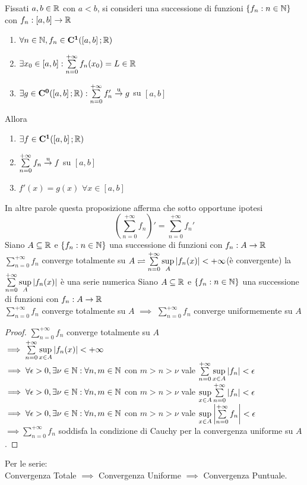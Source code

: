 \begin{corollary}
	\label{coro:deriv_series_series_of_deriv}
	Fissati $a,b\in \mathbb{R}$ con $a<b$, si consideri una successione di funzioni $\left\{f_n:n\in\mathbb{N}\right\}$ con $f_n:\left[a,b\right]\to \mathbb{R}$
	\begin{enumerate}
		\item $\forall n\in\mathbb{N}, f_n\in \mathbf{C^{1}}(\left[a,b\right]; \mathbb{R})$
		\item $\exists x_0\in\left[a,b\right]: \sum\limits_{n=0}^{+\infty}f_n(x_0)=L\in \mathbb{R}$
		\item $\exists g \in \mathbf{C^{0}}(\left[a,b\right]; \mathbb{R}): \sum\limits_{n=0}^{+\infty}f'_n \overset{\text{u}}{\to} g$ su $\left[a,b\right]$
	\end{enumerate}
	Allora
	\begin{enumerate}
		\item $\exists f\in \mathbf{C^{1}}(\left[a,b\right]; \mathbb{R})$
		\item $\sum\limits_{n=0}^{+\infty}f_n \overset{\text{u}}{\to} f$ su $\left[a,b\right]$
		\item $f'(x)=g(x)$ $\forall x\in\left[a,b\right]$
	\end{enumerate}
\end{corollary}
\observation
In altre parole questa proposizione afferma che sotto opportune ipotesi
\[\left(\sum\limits_{n=0}^{+\infty} f_n \right)' =  \sum\limits_{n=0}^{+\infty}f_n'\]
Siano $A\subseteq  \mathbb{R}$ e $\left\{f_n:n\in\mathbb{N}\right\}$ una successione di funzioni con $f_n:A\to \mathbb{R}$\\
$\sum\limits_{n=0}^{+\infty}f_n$ converge totalmente su $A \rightleftharpoons \sum\limits_{n=0}^{+\infty}\sup\limits_{A}\left|f_n(x)\right|<+\infty$(è convergente)
\observation
la $\sum\limits_{n=0}^{+\infty}\sup\limits_{A}\left|f_n(x)\right|$ è una serie numerica
\proposition
Siano $A\subseteq \mathbb{R}$ e $\left\{f_n:n\in\mathbb{N}\right\}$ una successione di funzioni con $f_n:A\to \mathbb{R}$\\
$\sum\limits_{n=0}^{+\infty}f_n$ converge totalmente su $A$ $\implies$  $\sum\limits_{n=0}^{+\infty}f_n$ converge uniformemente su $A$
\begin{proof}
	$\sum\limits_{n=0}^{+\infty}f_n$ converge totalmente su $A$\\
	$\implies \sum\limits_{n=0}^{+\infty}\sup\limits_{x\in A}\left|f_n(x)\right|<+\infty$\\
	$\implies \forall\epsilon>0, \exists\nu\in\mathbb{N}: \forall n,m\in\mathbb{N}$ con $m>n>\nu$ vale $\sum\limits_{n=0}^{+\infty}\sup\limits_{x\in A}\left|f_n\right|<\epsilon$\\
	$\implies \forall\epsilon>0, \exists\nu\in\mathbb{N}: \forall n,m\in\mathbb{N}$ con $m>n>\nu$ vale $\sup\limits_{x\in A}\sum\limits_{n=0}^{+\infty}\left|f_n\right|<\epsilon$\\
	$\implies \forall\epsilon>0, \exists\nu\in\mathbb{N}: \forall n,m\in\mathbb{N}$ con $m>n>\nu$ vale $\sup\limits_{x\in A}\left|\sum\limits_{n=0}^{+\infty}f_n\right|<\epsilon$\\
	$\implies \sum\limits_{n=0}^{+\infty}f_n$ soddisfa la condizione di Cauchy per la convergenza uniforme su $A$.
\end{proof}
\observation
Per le serie:\\
Convergenza Totale $\implies$ Convergenza Uniforme $\implies$ Convergenza Puntuale.
